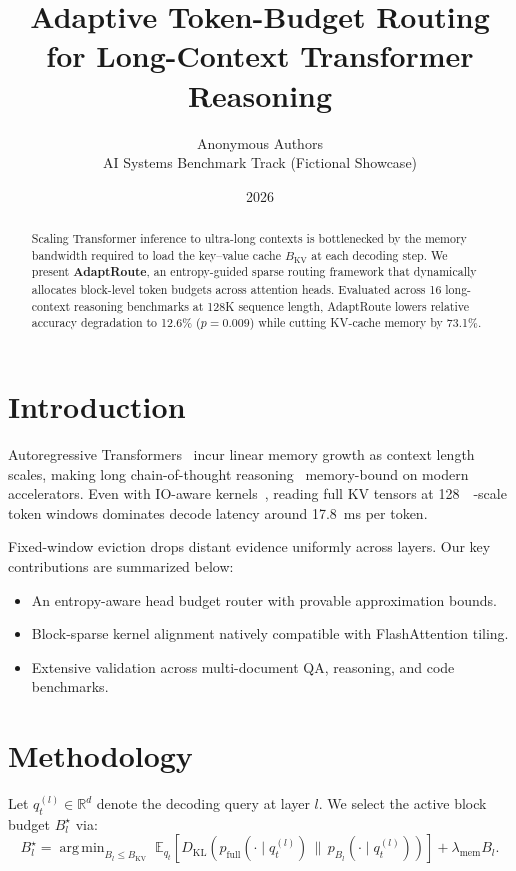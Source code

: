 \documentclass[11pt]{article}
\title{Adaptive Token-Budget Routing for Long-Context Transformer Reasoning}
\author{Anonymous Authors\\AI Systems Benchmark Track (Fictional Showcase)}
\date{2026}
\newcommand{\R}{\mathbb{R}}
\newcommand{\kvbudget}{B_{\mathrm{KV}}}
\newcommand{\argmin}{\operatorname{arg\,min}}
\begin{document}
\maketitle

\begin{abstract}
Scaling Transformer inference to ultra-long contexts is bottlenecked by the memory bandwidth required to load the key--value cache $\kvbudget$ at each decoding step. We present \textbf{AdaptRoute}, an entropy-guided sparse routing framework that dynamically allocates block-level token budgets across attention heads. Evaluated across 16 long-context reasoning benchmarks at 128K sequence length, AdaptRoute lowers relative accuracy degradation to 12.6\% ($p = 0.009$) while cutting KV-cache memory by 73.1\%.
\end{abstract}

\section{Introduction}
\label{sec:intro}

\indent Autoregressive Transformers~\cite{vaswani2017attention} incur linear memory growth as context length scales, making long chain-of-thought reasoning~\cite{wei2022cot} memory-bound on modern accelerators. Even with IO-aware kernels~\cite{dao2022flashattention}, reading full KV tensors at \SI{128}{\kilo\byte}-scale token windows dominates decode latency around \SI{17.8}{\milli\second} per token.

\noindent Fixed-window eviction drops distant evidence uniformly across layers. Our key contributions are summarized below:
\begin{itemize}
  \item An entropy-aware head budget router with provable approximation bounds.
  \item Block-sparse kernel alignment natively compatible with FlashAttention tiling.
  \item Extensive validation across multi-document QA, reasoning, and code benchmarks.
\end{itemize}

\section{Methodology}
\label{sec:method}

Let $q_t^{(l)} \in \R^d$ denote the decoding query at layer $l$. We select the active block budget $B_l^\star$ via:
\begin{equation}
\label{eq:route}
B_l^\star = \argmin_{B_l \le \kvbudget} \; \mathbb{E}_{q_t}\!\left[ D_{\mathrm{KL}}\!\left(p_{\mathrm{full}}(\cdot \mid q_t^{(l)}) \,\|\, p_{B_l}(\cdot \mid q_t^{(l)})\right) \right] + \lambda_{\mathrm{mem}} B_l.
\end{equation}
\end{document}

